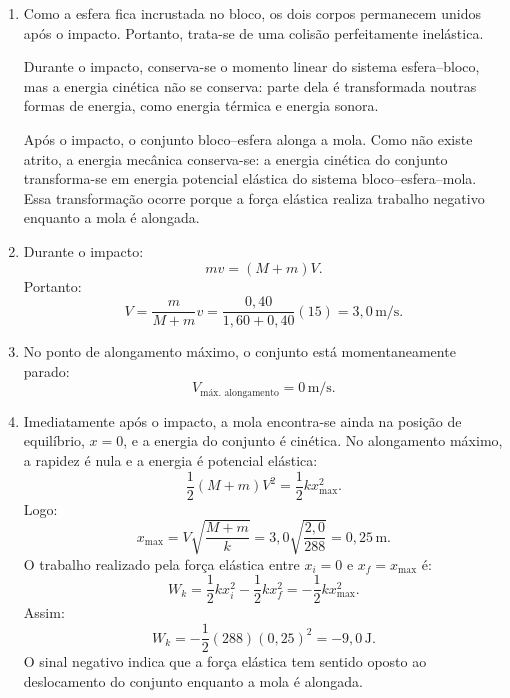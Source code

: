 \documentclass[12pt]{article}
\begin{document}
\begin{enumerate}[label=\textbf{\alph*)}]
    \item Como a esfera fica incrustada no bloco, os dois corpos permanecem unidos
    após o impacto. Portanto, trata-se de uma colisão perfeitamente inelástica.

    Durante o impacto, conserva-se o momento linear do sistema esfera--bloco, mas
    a energia cinética não se conserva: parte dela é transformada noutras formas de
    energia, como energia térmica e energia sonora.

    Após o impacto, o conjunto bloco--esfera alonga a mola. Como não existe atrito,
    a energia mecânica conserva-se: a energia cinética do conjunto transforma-se em
    energia potencial elástica do sistema bloco--esfera--mola. Essa transformação
    ocorre porque a força elástica realiza trabalho negativo enquanto a mola é
    alongada.

    \item Durante o impacto:
    \[
    mv=(M+m)V.
    \]
    Portanto:
    \[
    V=\frac{m}{M+m}v
    =\frac{0,40}{1,60+0,40}(15)
    =3,0\,\text{m/s}.
    \]

    \item No ponto de alongamento máximo, o conjunto está momentaneamente parado:
    \[
    V_{\text{máx. alongamento}}=0\,\text{m/s}.
    \]

    \item Imediatamente após o impacto, a mola encontra-se ainda na posição de
    equilíbrio, $x=0$, e a energia do conjunto é cinética. No alongamento máximo,
    a rapidez é nula e a energia é potencial elástica:
    \[
    \frac12(M+m)V^2=\frac12kx_{\max}^2.
    \]
    Logo:
    \[
    x_{\max}
    =V\sqrt{\frac{M+m}{k}}
    =3,0\sqrt{\frac{2,0}{288}}
    =0,25\,\text{m}.
    \]
    O trabalho realizado pela força elástica entre $x_i=0$ e $x_f=x_{\max}$ é:
    \[
    W_k=\frac12kx_i^2-\frac12kx_f^2
    =-\frac12kx_{\max}^2.
    \]
    Assim:
    \[
    W_k=-\frac12(288)(0,25)^2
    =-9,0\,\text{J}.
    \]
    O sinal negativo indica que a força elástica tem sentido oposto ao deslocamento
    do conjunto enquanto a mola é alongada.
\end{enumerate}
\end{document}
